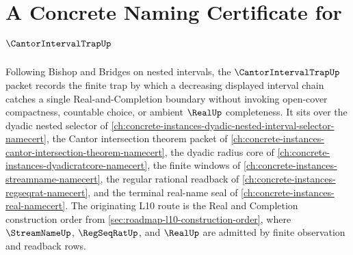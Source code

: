 \chapter{A Concrete Naming Certificate for $\CantorIntervalTrapUp$}
\label{ch:concrete-instances-cantor-interval-trap-namecert}

Following Bishop and Bridges on nested intervals, the $\CantorIntervalTrapUp$ packet records the finite trap by which a decreasing displayed interval chain catches a single Real-and-Completion boundary without invoking open-cover compactness, countable choice, or ambient $\RealUp$ completeness. It sits over the dyadic nested selector of \autoref{ch:concrete-instances-dyadic-nested-interval-selector-namecert}, the Cantor intersection theorem packet of \autoref{ch:concrete-instances-cantor-intersection-theorem-namecert}, the dyadic radius core of \autoref{ch:concrete-instances-dyadicratcore-namecert}, the finite windows of \autoref{ch:concrete-instances-streamname-namecert}, the regular rational readback of \autoref{ch:concrete-instances-regseqrat-namecert}, and the terminal real-name seal of \autoref{ch:concrete-instances-real-namecert}. The originating L10 route is the Real and Completion construction order from \autoref{sec:roadmap-l10-construction-order}, where $\StreamNameUp$, $\RegSeqRatUp$, and $\RealUp$ are admitted by finite observation and readback rows.

